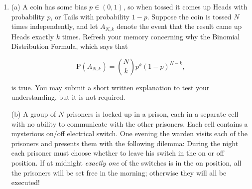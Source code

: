 \documentclass[11pt]{report}
\providecommand{\cal}{\mathcal}
\theoremstyle{plain}
\theoremstyle{definition}
\begin{document}
\begin{enumerate}[label=\arabic*.]
\noindent then we say that it is $\sigma\textbf{-additive}$. If
it satisfies

\begin{equation*}
\tag{24}\label{eq:P3}
A_1,\ldots ,A_n \in {\cal F}\textrm{ are pairwise disjoint} \implies
\mathrm{P}(\cup_{k=1}^n A_k) = \sum_{k=1}^n \mathrm{P}(A_k).
\end{equation*}

\noindent then we say that it is $\textbf{additive}$. Recall
that we defined a $\textbf{probability measure}$ to
be a pre-probability measure that is
$\sigma$-additive.

We say that a pre-probability measure satisfies the
$\textbf{continuity}$ properties if it satisfies

\begin{equation*}
\tag{25}\label{eq:cont1}
(A_n)_{n=1}^\infty  \subset {\cal F}, \ \ A_n \subset A_{n+1}\ \forall n \implies \mathrm{P}(\cup_{n=1}^\infty A_n) = \lim_{n\to\infty} \mathrm{P}(A_n),
\end{equation*}

\begin{equation*}
\tag{26}\label{eq:cont2}
(A_n)_{n=1}^\infty  \subset {\cal F}, \ \ A_n \supset A_{n+1}\ \forall n \implies \mathrm{P}(\cap_{n=1}^\infty A_n) = \lim_{n\to\infty} \mathrm{P}(A_n).
\end{equation*}

\noindent Prove that a probability measure satisfies the
continuity properties, and that an additive
pre-probability measure that satisfies the first
continuity property \eqref{eq:cont1} (``continuity from
below'') is $\sigma$-additive, and is therefore a
probability measure.

\item (a) A coin has some bias $p\in (0,1)$, so when tossed
it comes up Heads with probability $p$, or Tails with
probability $1-p$. Suppose the coin is tossed $N$
times independently, and let $A_{N,k}$ denote the
event that the result came up Heads exactly $k$
times. Refresh your memory concerning why the Binomial
Distribution Formula, which says that

\begin{equation*}
\tag{27}\label{eq:binomial}
\mathrm{P}(A_{N,k}) = \binom{N}{k} p^k (1-p)^{N-k},
\end{equation*}

\noindent is true. You may submit a short written explanation
to test your understanding, but it is not required.

(b) A group of $N$ prisoners is locked up in a
prison, each in a separate cell with no ability to
communicate with the other prisoners. Each cell
contains a mysterious on/off electrical switch. One
evening the warden visits each of the prisoners and
presents them with the following dilemma: During the
night each prisoner must choose whether to leave his
switch in the on or off position. If at midnight
\emph{exactly one} of the switches is in the on position,
all the prisoners will be set free in the morning;
otherwise they will all be executed!


\end{enumerate}
\end{document}
